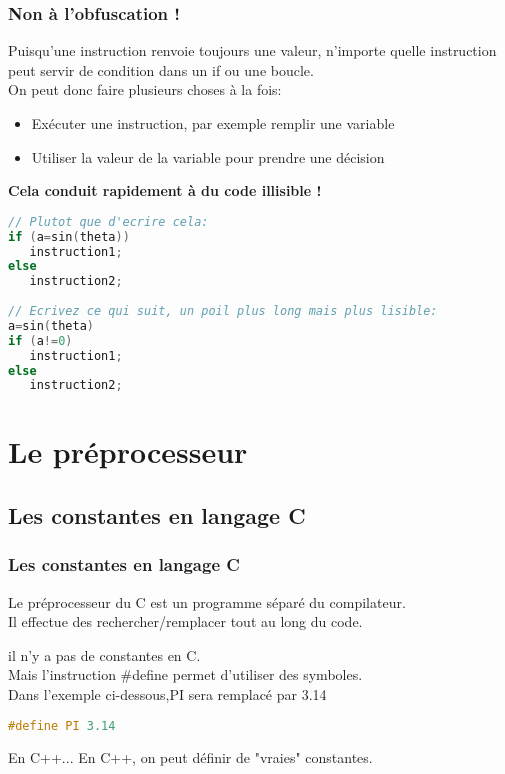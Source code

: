 \documentclass{beamer}
\begin{document}
\begin{frame}[fragile=singleslide,shrink=20]
\frametitle {Non à l'obfuscation !}
Puisqu'une instruction renvoie toujours une valeur, n'importe quelle instruction \\
peut servir de condition dans un if ou une boucle.\\
On peut donc faire plusieurs choses à la fois:
\begin{itemize}
\item{Exécuter une instruction, par exemple remplir une variable}
\item{Utiliser la valeur de la variable pour prendre une décision}
\end{itemize}

\textbf{Cela conduit rapidement à du code illisible !}

\begin{lstlisting}[language=c++]
// Plutot que d'ecrire cela:
if (a=sin(theta))
   instruction1;
else
   instruction2;
   
// Ecrivez ce qui suit, un poil plus long mais plus lisible:
a=sin(theta)
if (a!=0)
   instruction1;
else
   instruction2;
\end{lstlisting}
\end{frame}

\section{Le préprocesseur}

\subsection{Les constantes en langage C}

\begin{frame}[fragile=singleslide,shrink=20]
\frametitle {Les constantes en langage C}
Le préprocesseur du C est un programme séparé du compilateur. \\
Il effectue des rechercher/remplacer tout au long du code.

il n'y a pas de constantes en C. \\
Mais l'instruction \#define permet d'utiliser des symboles. \\
Dans l'exemple ci-dessous,PI sera remplacé par 3.14

\begin{lstlisting}[language=c++]
#define PI 3.14
\end{lstlisting}

\begin{block}{En C++...}
En C++, on peut définir de "vraies" constantes.
\end{block}

\end{frame}
\end{document}
